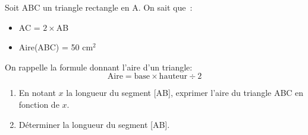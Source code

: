 \documentclass[exercice]{thedocument}%
\begin{document}
%
Soit ABC un triangle rectangle en A. On sait que~:
\begin{itemize}
    \item AC = $2\times$AB
    \item Aire(ABC) = 50 cm$^2$
\end{itemize}
\par\medskip\noindent
On rappelle la formule donnant l'aire d'un triangle:
$$\text{Aire}=\text{base}\times\text{hauteur}\div2$$
\begin{enumerate}
    \item En notant $x$ la longueur du segment [AB], exprimer l'aire du triangle ABC
    en fonction de $x$.
    \item Déterminer la longueur du segment [AB].
\end{enumerate}
\end{document}
